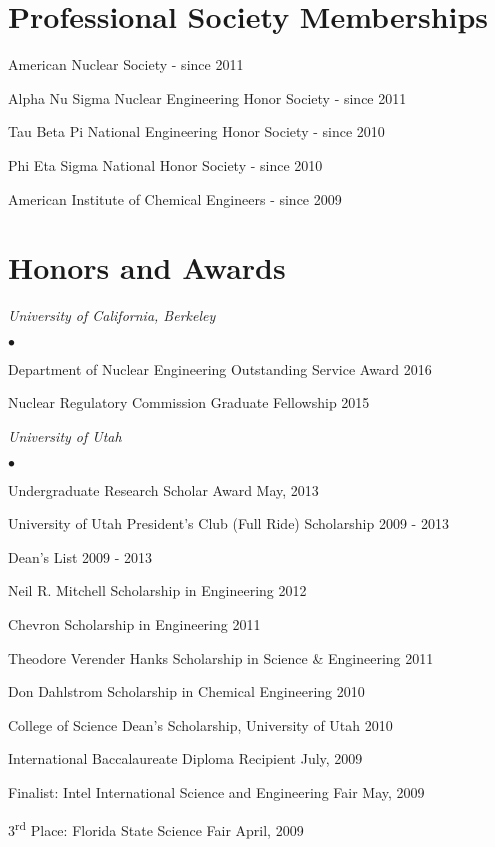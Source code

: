 \documentclass[margin,line]{res}
\newenvironment{list1}{
  \begin{list}{\ding{113}}{%
      \setlength{\itemsep}{0in}
      \setlength{\parsep}{0in} \setlength{\parskip}{0in}
      \setlength{\topsep}{0in} \setlength{\partopsep}{0in} 
      \setlength{\leftmargin}{0.17in}}}{\end{list}}
\newenvironment{list2}{
  \begin{list}{$\bullet$}{%
      \setlength{\itemsep}{0in}
      \setlength{\parsep}{0in} \setlength{\parskip}{0in}
      \setlength{\topsep}{0in} \setlength{\partopsep}{0in} 
      \setlength{\leftmargin}{0.2in}}}{\end{list}}
\begin{document}
\begin{resume}
\section{\sc Professional Society Memberships} 
\begin{list1}
\item[] American Nuclear Society  \hfill{ - since 2011}
\item[] Alpha Nu Sigma Nuclear Engineering Honor Society \hfill{- since 2011}
\item[] Tau Beta Pi National Engineering Honor Society \hfill{- since 2010}
\item[] Phi Eta Sigma National Honor Society \hfill{- since 2010}
\item[] American Institute of Chemical Engineers \hfill{- since 2009}
\end{list1}

\section{\sc Honors and Awards} 

\begin{list1}
\item[] \textit{University of California, Berkeley}
\begin{list2}
\item Department of Nuclear Engineering Outstanding Service Award \hfill{2016}
\item Nuclear Regulatory Commission Graduate Fellowship \hfill{2015}
\end{list2}
\item[] \textit{University of Utah}
\begin{list2}
\item  Undergraduate Research Scholar Award \hfill{May, 2013}
\item University of Utah President's Club (Full Ride) Scholarship \hfill{2009 - 2013}
\item Dean's List \hfill{2009 - 2013}
\item Neil R. Mitchell Scholarship in Engineering \hfill{2012}
\item Chevron Scholarship in Engineering \hfill{2011}
\item Theodore Verender Hanks Scholarship in Science \& Engineering \hfill{2011}
\item Don Dahlstrom Scholarship in Chemical Engineering \hfill{2010}
\item College of Science Dean's Scholarship, University of Utah \hfill{2010}
\end{list2}
\item[] International Baccalaureate Diploma Recipient  \hfill{July, 2009}
\item[] Finalist: Intel International Science and Engineering Fair  \hfill{ May, 2009}
\item[] 3\textsuperscript{rd} Place: Florida State Science Fair  \hfill{April, 2009}
\end{list1}






\end{resume}
\end{document}
